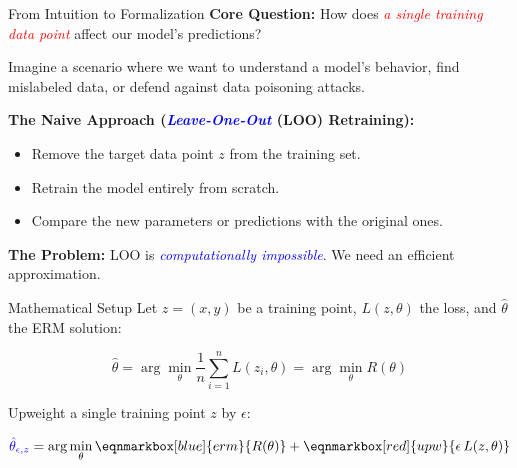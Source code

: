 \documentclass[aspectratio=169]{beamer}
\renewcommand{\emph}[1]{\textit{\textcolor{blue}{#1}}}
\newcommand{\remph}[1]{\textit{\textcolor{red}{#1}}}
\begin{document}
\begin{frame}{From Intuition to Formalization}
    \textbf{Core Question:} How does \remph{a single training data point} affect our model's predictions?
    
    \vspace{0.5cm}
    Imagine a scenario where we want to understand a model's behavior, find mislabeled data, or defend against data poisoning attacks.
    
    \pause
    \vspace{0.5cm}
    \textbf{The Naive Approach (\emph{Leave-One-Out} (LOO) Retraining):}
    \begin{itemize}
        \item Remove the target data point $z$ from the training set.
        \item Retrain the model entirely from scratch.
        \item Compare the new parameters or predictions with the original ones.
    \end{itemize}
    
    \pause
    \vspace{0.5cm}
    \textbf{The Problem:} %
    LOO is \emph{computationally impossible}. We need an efficient approximation.
\end{frame}

\begin{frame}{Mathematical Setup}
    Let $z = (x, y)$ be a training point, $L(z, \theta)$ the loss, and $\hat{\theta}$ the ERM solution:

    \begin{equation}
        \hat{\theta} = \arg\min_{\theta} \frac{1}{n} \sum_{i=1}^{n} L(z_i, \theta) = \arg\min_{\theta} R(\theta)
    \end{equation}

    \pause

    \vspace{0.5cm}
    Upweight a single training point $z$ by $\epsilon$:

    \begin{equation}
        \textcolor{blue}{\hat{\theta}_{\epsilon, z}} = \arg\min_{\theta} \eqnmarkbox[blue]{erm}{R(\theta)} + \eqnmarkbox[red]{upw}{\epsilon \, L(z, \theta)}
    \end{equation}

\end{frame}
\end{document}

